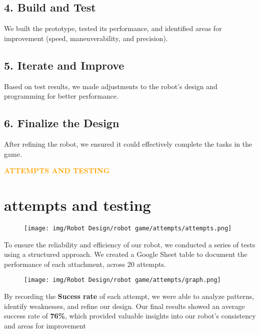 \subsection{4. Build and Test}
We built the prototype, tested its performance, and identified areas for improvement (speed, maneuverability, and precision).

\subsection{5. Iterate and Improve}
Based on test results, we made adjustments to the robot's design and programming for better performance.

\subsection{6. Finalize the Design}
After refining the robot, we ensured it could effectively complete the tasks in the game.


\newpage
\begin{center}
    \huge \textbf{\textcolor{orange}{ATTEMPTS AND TESTING}} \\[0.5cm]
\end{center}
\section{attempts and testing}
\vspace{0.5cm}
\begin{figure}[h!]
    \centering
    \texttt{[image: img/Robot Design/robot game/attempts/attempts.png]}
    
\end{figure}
To ensure the reliability and efficiency of our robot, we conducted a series of tests using a structured approach. We created a Google Sheet table to document the performance of each attachment, across 20 attempts. 


\vspace{0.5cm}
\begin{figure}[h!]
    \centering
    \texttt{[image: img/Robot Design/robot game/attempts/graph.png]}
    
\end{figure}
By recording the \textbf{Sucess rate} of each attempt, we were able to analyze patterns, identify weaknesses, and refine our design. Our final results showed an average success rate of \textbf{76\%}, which provided valuable insights into our robot’s consistency and areas for improvement


